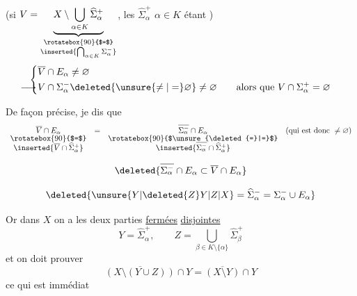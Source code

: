    (si $V=\underset{\substack{\rotatebox{90}{$=$}\\ \inserted{\bigcap_{\alpha\in K}\Sigma_\alpha^-}}}{\underbrace{X\setminus\bigcup_{\alpha\in K}\widehat{\Sigma}_\alpha^+}}$, les $\widehat{\Sigma}_\alpha^+$ \unsure{(}$\alpha\in K$\unsure{)} étant )
\[
\left\{\begin{aligned}
&\overline V\cap E_\alpha\ne\varnothing\\
&\makebox[0pt][r]{$\longrightarrow$\hspace{.15em}}V\cap\Sigma_\alpha^-\deleted{\unsure{\ne|=}\varnothing}\ne\varnothing
\qquad\text{alors que } V\cap\Sigma_\alpha^+=\varnothing
\end{aligned}\right.
\]
\reversemarginpar{}\normalmarginpar

De façon précise, je dis que
\[
\begin{array}{ccc@{\quad}l}
\overline V\cap E_\alpha & = & \overline{\Sigma_\alpha^-}\cap E_\alpha & \text{(qui est donc }\ne\varnothing\text{)}\\[-2pt]
\rotatebox{90}{$=$} && \rotatebox{90}{$\unsure{\deleted{=}|=}$} &\\[-2pt]
\inserted{\overline V\cap\widehat{\Sigma}_\alpha^+} && \inserted{\overline{\Sigma_\alpha^-}\cap\widehat{\Sigma}_\alpha^+} &
\end{array}
\]

\[
\deleted{\overline{\Sigma_\alpha^-}\cap E_\alpha\subset\overline V\cap E_\alpha}
\]
  

      
\[
\deleted{\unsure{Y|\deleted{Z}Y|Z|X}=\widehat{\Sigma}_\alpha^-=\Sigma_\alpha^-\cup E_\alpha}
\]
 

Or dans $X$ on a les deux parties \uline{fermées} \uline{disjointes}
\[
Y=\widehat{\Sigma}_\alpha^+,\qquad Z=\bigcup_{\beta\in K\setminus\{\alpha\}}\widehat{\Sigma}_\beta^+
\]
et on doit prouver
\[
\overline{(X\setminus(Y\cup Z))}\cap Y=\overline{(X\setminus Y)}\cap Y
\]
ce qui est immédiat

